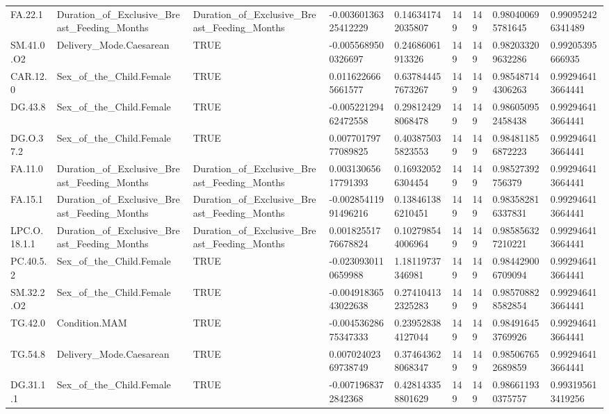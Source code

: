 \begin{longtable}{lllllllll}
FA.22.1 & Duration\_of\_Exclusive\_Breast\_Feeding\_Months & Duration\_of\_Exclusive\_Breast\_Feeding\_Months & -0.00360136325412229 & 0.146341742035807 & 149 & 149 & 0.980400695781645 & 0.990952426341489 \\
SM.41.0.O2 & Delivery\_Mode.Caesarean & TRUE & -0.0055689500326697 & 0.24686061913326 & 149 & 149 & 0.982033209632286 & 0.99205395666935 \\
CAR.12.0 & Sex\_of\_the\_Child.Female & TRUE & 0.0116226665661577 & 0.637844457673267 & 149 & 149 & 0.985487144306263 & 0.992946413664441 \\
DG.43.8 & Sex\_of\_the\_Child.Female & TRUE & -0.00522129462472558 & 0.298124298068478 & 149 & 149 & 0.986050952458438 & 0.992946413664441 \\
DG.O.37.2 & Sex\_of\_the\_Child.Female & TRUE & 0.00770179777089825 & 0.403875035823553 & 149 & 149 & 0.984811856872223 & 0.992946413664441 \\
FA.11.0 & Duration\_of\_Exclusive\_Breast\_Feeding\_Months & Duration\_of\_Exclusive\_Breast\_Feeding\_Months & 0.00313065617791393 & 0.169320526304454 & 149 & 149 & 0.98527392756379 & 0.992946413664441 \\
FA.15.1 & Duration\_of\_Exclusive\_Breast\_Feeding\_Months & Duration\_of\_Exclusive\_Breast\_Feeding\_Months & -0.00285411991496216 & 0.138461386210451 & 149 & 149 & 0.983582816337831 & 0.992946413664441 \\
LPC.O.18.1.1 & Duration\_of\_Exclusive\_Breast\_Feeding\_Months & Duration\_of\_Exclusive\_Breast\_Feeding\_Months & 0.00182551776678824 & 0.102798544006964 & 149 & 149 & 0.985856327210221 & 0.992946413664441 \\
PC.40.5.2 & Sex\_of\_the\_Child.Female & TRUE & -0.0230930110659988 & 1.18119737346981 & 149 & 149 & 0.984429006709094 & 0.992946413664441 \\
SM.32.2.O2 & Sex\_of\_the\_Child.Female & TRUE & -0.00491836543022638 & 0.274104132325283 & 149 & 149 & 0.985708828582854 & 0.992946413664441 \\
TG.42.0 & Condition.MAM & TRUE & -0.00453628675347333 & 0.239528384127044 & 149 & 149 & 0.984916453769926 & 0.992946413664441 \\
TG.54.8 & Delivery\_Mode.Caesarean & TRUE & 0.00702402369738749 & 0.374643628068347 & 149 & 149 & 0.985067652689859 & 0.992946413664441 \\
DG.31.1.1 & Sex\_of\_the\_Child.Female & TRUE & -0.0071968372842368 & 0.428143358801629 & 149 & 149 & 0.986611930375757 & 0.993195613419256 \\

\end{longtable}

